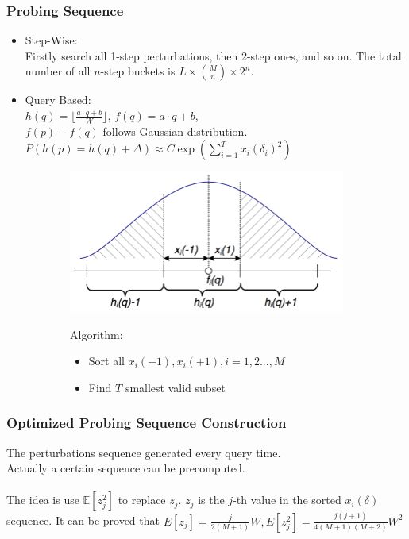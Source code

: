 \begin{frame}[shrink]
	\frametitle{Probing Sequence}
	\begin{itemize}
		\item Step-Wise: \\
		Firstly search all 1-step perturbations, then 2-step ones, and so on.
		The total number of all $n$-step buckets is $L{\times} {M\choose n}{\times}2^n$.
		\item Query Based: \\
		$h(q)=\lfloor\frac{a\cdot q+b}{W}\rfloor$, $f(q)=a\cdot q + b$,\\ $f(p)-f(q)$ follows Gaussian distribution.\\
		$P(h(p)=h(q)+\Delta)\approx C\exp(\sum_{i=1}^{T}x_i(\delta_i)^2)$
	\end{itemize}
	\begin{figure}[h]
	\centering
	\begin{subfigure}{0.25\textwidth}
  	\includegraphics[width=\linewidth]{figures/multi_probe_nn}
  	\end{subfigure}
  	\begin{subfigure}{0.6\textwidth}
  	Algorithm:
  	\begin{itemize}
  		\item Sort all $x_i(-1), x_i(+1), i{=}1,2...,M$ 
  		\item Find $T$ smallest valid subset
  	\end{itemize}
  	\end{subfigure}
	\end{figure}
	
\end{frame}

\begin{frame}
\frametitle{Optimized Probing Sequence Construction}	
The perturbations sequence generated every query time.\\
Actually a certain sequence can be precomputed.\\
~\\

The idea is use $\mathbb{E}[z_j^2]$ to replace $z_j$.
$z_j$ is the $j$-th value in the sorted $x_i(\delta)$ sequence.
It can be proved that $E[z_j]{=}\frac{j}{2(M+1)}W, E[z_j^2]{=}\frac{j(j+1)}{4(M+1)(M+2)}W^2$
~\\
\end{frame}

